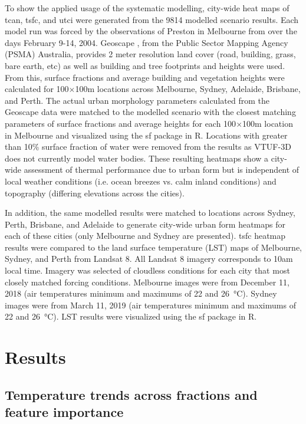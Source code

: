 \documentclass[final,3p,times,authoryear]{elsarticle}
\begin{document}
To show the applied usage of the systematic modelling, city-wide heat maps of \gls{tcan}, \gls{tsfc}, and \gls{utci} were generated from the 9814 modelled scenario results. Each model run was forced by the observations of Preston in Melbourne from \cite{Coutts2007} over the days February 9-14, 2004. Geoscape \citep{Geoscape2020}, from the Public Sector Mapping Agency (PSMA) Australia, provides 2 meter resolution land cover (road, building, grass, bare earth, etc) as well as building and tree footprints and heights were used. From this, surface fractions and average building and vegetation heights were calculated for 100$\times$100m locations across Melbourne, Sydney, Adelaide, Brisbane, and Perth. The actual urban morphology parameters calculated from the Geoscape data were matched to the modelled scenario with the closest matching parameters of surface fractions and average heights for each 100$\times$100m location in Melbourne and visualized using the sf package \citep{Pebesma2018} in R. Locations with greater than 10\% surface fraction of water were removed from the results as VTUF-3D does not currently model water bodies. These resulting heatmaps show a city-wide assessment of thermal performance due to urban form but is independent of local weather conditions (i.e. ocean breezes vs. calm inland conditions) and topography (differing elevations across the cities). 

In addition, the same modelled results were matched to locations across Sydney, Perth, Brisbane, and Adelaide to generate city-wide urban form heatmaps for each of these cities (only Melbourne and Sydney are presented). \gls{tsfc} heatmap results were compared to the land surface temperature (LST) maps of Melbourne, Sydney, and Perth from Landsat 8. All Landsat 8 imagery corresponds to 10am local time. Imagery was selected of cloudless conditions for each city that most closely matched forcing conditions. Melbourne images were from December 11, 2018  (air temperatures minimum and maximums of 22 and 26\SI{}{\degreeCelsius}). Sydney images were from March 11, 2019  (air temperatures minimum and maximums of 22 and 26\SI{}{\degreeCelsius}). LST results were visualized using the sf package \citep{Pebesma2018} in R.

\section{Results}\label{sec:results}

\subsection{Temperature trends across fractions and feature importance}\label{sec:resulttrends}
\end{document}
